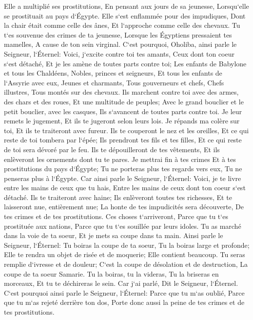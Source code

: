 \verse Elle a multiplié ses prostitutions, En pensant aux jours de sa jeunesse, Lorsqu`elle se prostituait au pays d`Égypte. 
\verse Elle s`est enflammée pour des impudiques, Dont la chair était comme celle des ânes, Et l`approche comme celle des chevaux. 
\verse Tu t`es souvenue des crimes de ta jeunesse, Lorsque les Égyptiens pressaient tes mamelles, A cause de ton sein virginal. 
\verse C`est pourquoi, Oholiba, ainsi parle le Seigneur, l`Éternel: Voici, j`excite contre toi tes amants, Ceux dont ton coeur s`est détaché, Et je les amène de toutes parts contre toi; 
\verse Les enfants de Babylone et tous les Chaldéens, Nobles, princes et seigneurs, Et tous les enfants de l`Assyrie avec eux, Jeunes et charmants, Tous gouverneurs et chefs, Chefs illustres, Tous montés sur des chevaux. 
\verse Ils marchent contre toi avec des armes, des chars et des roues, Et une multitude de peuples; Avec le grand bouclier et le petit bouclier, avec les casques, Ils s`avancent de toutes parts contre toi. Je leur remets le jugement, Et ils te jugeront selon leurs lois. 
\verse Je répands ma colère sur toi, Et ils te traiteront avec fureur. Ils te couperont le nez et les oreilles, Et ce qui reste de toi tombera par l`épée; Ils prendront tes fils et tes filles, Et ce qui reste de toi sera dévoré par le feu. 
\verse Ils te dépouilleront de tes vêtements, Et ils enlèveront les ornements dont tu te pares. 
\verse Je mettrai fin à tes crimes Et à tes prostitutions du pays d`Égypte; Tu ne porteras plus tes regards vers eux, Tu ne penseras plus à l`Égypte. 
\verse Car ainsi parle le Seigneur, l`Éternel: Voici, je te livre entre les mains de ceux que tu hais, Entre les mains de ceux dont ton coeur s`est détaché. 
\verse Ils te traiteront avec haine; Ils enlèveront toutes tes richesses, Et te laisseront nue, entièrement nue; La honte de tes impudicités sera découverte, De tes crimes et de tes prostitutions. 
\verse Ces choses t`arriveront, Parce que tu t`es prostituée aux nations, Parce que tu t`es souillée par leurs idoles. 
\verse Tu as marché dans la voie de ta soeur, Et je mets sa coupe dans ta main. 
\verse Ainsi parle le Seigneur, l`Éternel: Tu boiras la coupe de ta soeur, Tu la boiras large et profonde; Elle te rendra un objet de risée et de moquerie; Elle contient beaucoup. 
\verse Tu seras remplie d`ivresse et de douleur; C`est la coupe de désolation et de destruction, La coupe de ta soeur Samarie. 
\verse Tu la boiras, tu la videras, Tu la briseras en morceaux, Et tu te déchireras le sein. Car j`ai parlé, Dit le Seigneur, l`Éternel. 
\verse C`est pourquoi ainsi parle le Seigneur, l`Éternel: Parce que tu m`as oublié, Parce que tu m`as rejeté derrière ton dos, Porte donc aussi la peine de tes crimes et de tes prostitutions. 
